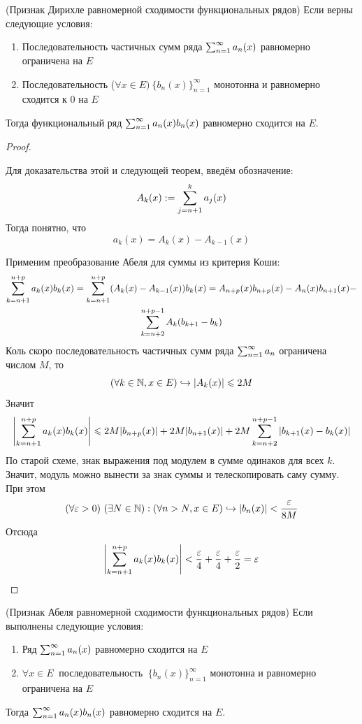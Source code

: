 \begin{theorem} (Признак Дирихле равномерной сходимости функциональных рядов)
	Если верны следующие условия:
	\begin{enumerate}
		\item Последовательность частичных сумм ряда $\sum_{n = 1}^\infty a_n(x)$ равномерно ограничена на $E$
		
		\item Последовательность ($\forall x \in E)\ \{b_n(x)\}_{n = 1}^\infty$ монотонна и равномерно сходится к 0 на $E$
	\end{enumerate}
	Тогда функциональный ряд $\sum_{n = 1}^\infty a_n(x)b_n(x)$ равномерно сходится на $E$.
\end{theorem}

\begin{proof}
	
	\begin{note}
		Для доказательства этой и следующей теорем, введём обозначение:
		\[
		A_k(x) := \sum\limits_{j = n + 1}^k a_j(x)
		\]
		Тогда понятно, что
		\[
		a_k(x) = A_k(x) - A_{k - 1}(x)
		\]
	\end{note}

	Применим преобразование Абеля для суммы из критерия Коши:
	\begin{multline*}
		\sum\limits_{k = n + 1}^{n + p} a_k(x)b_k(x) = \sum\limits_{k = n + 1}^{n + p} (A_k(x) - A_{k - 1}(x))b_k(x) = A_{n + p}(x) b_{n + p}(x) - A_n(x)b_{n + 1}(x) -
		\\
		\sum\limits_{k = n + 2}^{n + p - 1} A_k(b_{k + 1} - b_k)
	\end{multline*}
	Коль скоро последовательность частичных сумм ряда $\sum_{n = 1}^\infty a_n$ ограничена числом $M$, то
	\[
		(\forall k \in \mathbb{N}, x \in E)\hookrightarrow |A_k(x)| \leqslant 2M
	\]
	Значит
	\[
		\left|\sum\limits_{k = n + 1}^{n + p} a_k(x)b_k(x)\right| \leqslant 2M |b_{n + p}(x)| + 2M |b_{n + 1}(x)| + 2M \sum\limits_{k = n + 2}^{n + p - 1} |b_{k + 1}(x) - b_k(x)|
	\]
	По старой схеме, знак выражения под модулем в сумме одинаков для всех $k$. Значит, модуль можно вынести за знак суммы и телескопировать саму сумму. При этом
	\[
		(\forall \varepsilon > 0)\ (\exists N \in \mathbb{N}) : (\forall n > N, x \in E) \hookrightarrow |b_n(x)| < \frac{\varepsilon}{8M}
	\]
	Отсюда
	\[
		\left|\sum\limits_{k = n + 1}^{n + p} a_k(x)b_k(x)\right| < \frac{\varepsilon}{4} + \frac{\varepsilon}{4} + \frac{\varepsilon}{2} = \varepsilon
	\]
\end{proof}

\begin{theorem} (Признак Абеля равномерной сходимости функциональных рядов)
	Если выполнены следующие условия:
	\begin{enumerate}
		\item Ряд $\sum_{n = 1}^\infty a_n(x)$ равномерно сходится на $E$
		
		\item $\forall x \in E\ $ последовательность $\ \{b_n(x)\}_{n = 1}^\infty$ монотонна и равномерно ограничена на $E$
	\end{enumerate}
	Тогда $\sum_{n = 1}^\infty a_n(x)b_n(x)$ равномерно сходится на $E$.
\end{theorem}

